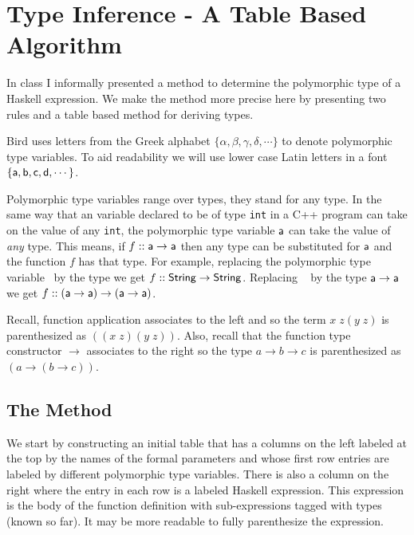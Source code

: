 \documentclass[11pt]{article}
\begin{document}




\section{Type Inference - A Table Based Algorithm}


In class I informally presented a method to determine the polymorphic type of a
Haskell expression.  We make the method more precise here by presenting two
rules and a table based method for deriving types.

Bird uses letters from the Greek alphabet
$\{\alpha,\beta,\gamma,\delta,\cdots\}$ to denote polymorphic type
variables. To aid readability we will use lower case Latin letters in a
{} font $\{{\sf{a}},{\sf{b}},{\sf{c}},{\sf{d}},\cdots\}$.

Polymorphic type variables range over types, they stand for any type.  In the
same way that an variable declared to be of type {\tt{int}} in a C++ program
can take on the value of any {\tt{int}}, the polymorphic type variable ${\sf{a}}$
can take the value of {\it{any}} type.  This means, if $f::{\sf{a}}\rightarrow{\sf{a}}$
then any type can be substituted for ${\sf{a}}$ and the function $f$ has that type.
For example, replacing the polymorphic type variable \sfa~by the type
{} we get $f::{\sf{String}}\rightarrow{\sf{String}}$.  Replacing
\sfa~ by the type ${\sf{a}}\rightarrow{\sf{a}}$ we get
$f::({\sf{a}}\rightarrow{\sf{a}})\rightarrow({\sf{a}}\rightarrow{\sf{a}})$.

Recall, function application associates to the left and so the term $x\;z
(y\;z)$ is parenthesized as $((x\;z)(y\;z))$. Also, recall that the function
type constructor $\rightarrow$ associates to the right so the type
$a\rightarrow{}b\rightarrow{}c$ is parenthesized as
$(a\rightarrow{}(b\rightarrow{}c))$.


\subsection{The Method}

We start by constructing an initial table that has a columns on the left
labeled at the top by the names of the formal parameters and whose first row
entries are labeled by different polymorphic type variables. There is also a
column on the right where the entry in each row is a labeled Haskell
expression.  This expression is the body of the function definition with
sub-expressions tagged with types (known so far). It may be more readable to
fully parenthesize the expression.
\end{document}
